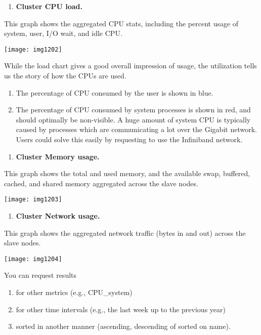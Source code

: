 \begin{enumerate}
\item  \textbf{Cluster CPU load.}
\end{enumerate}

This graph shows the aggregated CPU stats, including the percent usage of system, user, I/O wait, and idle CPU.

\texttt{[image: img1202]}

While the load chart gives a good overall impression of usage, the utilization tells us the story of how the CPUs are used.

\begin{enumerate}
\item \textbf{ }The percentage of CPU consumed by the user is shown in blue.
\item  The percentage of CPU consumed by system processes is shown in red, and should optimally be non-visible.  A huge amount of system CPU is typically caused by processes which are communicating a lot over the Gigabit network. Users could solve this easily by requesting to use the Infiniband network.
\end{enumerate}

\begin{enumerate}
\item  \textbf{Cluster Memory usage.}
\end{enumerate}

This graph shows the total and used memory, and the available swap, buffered, cached, and shared memory aggregated across the slave nodes.

\texttt{[image: img1203]}

\begin{enumerate}
\item \textbf{ Cluster Network usage.}
\end{enumerate}

This graph shows the aggregated network traffic (bytes in and out) across the slave nodes.

\texttt{[image: img1204]}

You can request results

\begin{enumerate}
\item  for other metrics (e.g., CPU\_system)
\item  for other time intervals (e.g., the last week up to the previous year)
\item  sorted in another manner (ascending, descending of sorted on name).
\end{enumerate}

